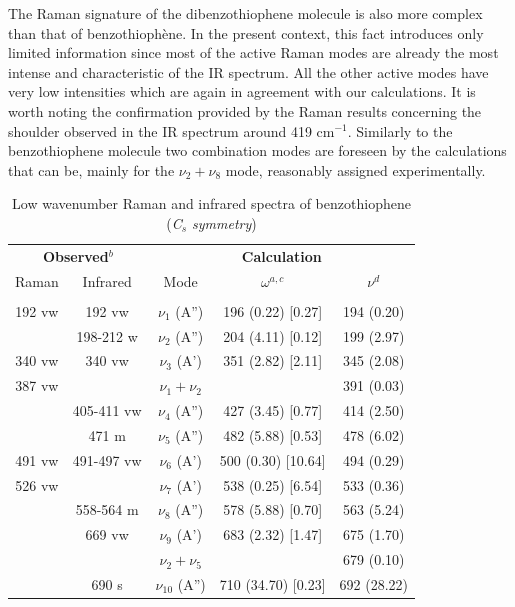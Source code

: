 	The Raman signature of the dibenzothiophene molecule is also more complex than that of benzothiophène. In the present context, this fact introduces only limited information since most of the active Raman modes are already the most intense and characteristic of the IR spectrum. All the other active modes have very low intensities which are again in agreement with our calculations. It is worth noting the confirmation provided by the Raman results concerning the shoulder observed in the IR spectrum around 419 cm$^{-1}$. 
	Similarly to the benzothiophene molecule two combination modes are foreseen by the calculations that can be, mainly for the $\nu_{2}+\nu_{8}$ mode, reasonably assigned experimentally.\\
	
	
	
	\begin{table}[H]
		\begin{center}
			\caption[Low wavenumber Raman and infrared spectra of benzothiophene]{Low wavenumber Raman and infrared spectra of benzothiophene (\textit{C$_s$ symmetry})} \label{tableP1-1}
			\begin{threeparttable}[b]
				\begin{tabular}{c c c c c}
					\toprule
					\multicolumn{2}{p{5cm}}{\centering \textbf{Observed$^{b}$}} & \multicolumn{3}{p{10cm}}{\centering \textbf{Calculation}} \\
					Raman & Infrared & Mode & $\omega^{a,c}$ & $\nu^{d}$ \\
					\midrule
					&  &   &    &   \\
					192 vw & 192 vw & $\nu_{1}$ (A”) & 196 (0.22) [0.27] & 194 (0.20)\\
					& 198-212 w & $\nu_{2}$ (A”) & 204 (4.11) [0.12] & 199 (2.97) \\
					340 vw & 340 vw & $\nu_{3}$ (A') & 351 (2.82) [2.11] & 345 (2.08) \\
					387 vw &   & $\nu_{1} + \nu_{2}$ &  & 391 (0.03) \\
					& 405-411 vw & $\nu_{4}$ (A”) & 427 (3.45) [0.77] & 414 (2.50)\\
					& 471 m & $\nu_{5}$ (A”) & 482 (5.88) [0.53] & 478 (6.02) \\
					491 vw & 491-497 vw & $\nu_{6}$ (A') & 500 (0.30) [10.64] & 494 (0.29) \\
					526 vw &  & $\nu_{7}$ (A') & 538 (0.25) [6.54] & 533 (0.36) \\
					& 558-564 m & $\nu_{8}$ (A”) & 578 (5.88) [0.70] & 563 (5.24)\\
					& 669 vw & $\nu_{9}$ (A') & 683 (2.32) [1.47] & 675 (1.70)\\
					&  & $\nu_{2} + \nu_{5}$ &  & 679 (0.10) \\
					& 690 s & $\nu_{10}$ (A”) & 710 (34.70) [0.23] & 692 (28.22)\\
					\bottomrule 
				\end{tabular}
				

\end{threeparttable}
\end{center}
\end{table}
